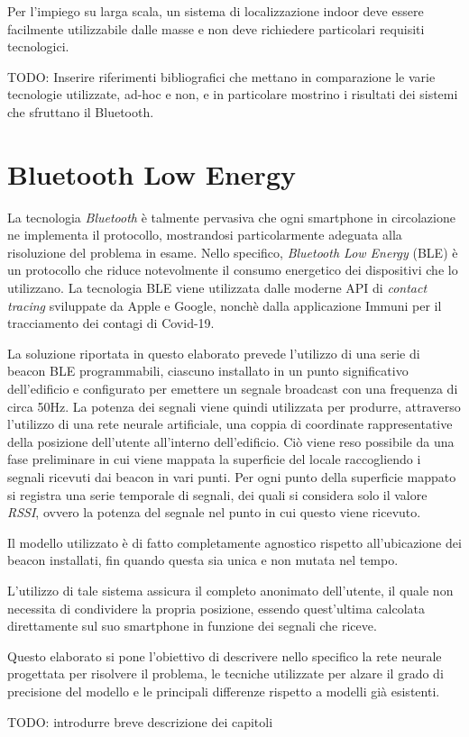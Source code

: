 \documentclass[draft]{standalone}
\begin{document}
Per l'impiego su larga scala, un sistema di localizzazione indoor deve essere
facilmente utilizzabile dalle masse e non deve richiedere particolari requisiti
tecnologici.

{\large TODO: Inserire riferimenti bibliografici che mettano in comparazione le
  varie tecnologie utilizzate, ad-hoc e non, e in particolare mostrino i
  risultati dei sistemi che sfruttano il Bluetooth.}

\section{Bluetooth Low Energy}
La tecnologia \emph{Bluetooth} è talmente pervasiva che ogni smartphone in
circolazione ne implementa il protocollo, mostrandosi particolarmente adeguata
alla risoluzione del problema in esame. Nello specifico, \emph{Bluetooth Low
  Energy} (BLE) è un protocollo che riduce notevolmente il consumo energetico
dei dispositivi che lo utilizzano. La tecnologia BLE viene utilizzata dalle
moderne API di \emph{contact tracing} sviluppate da Apple e Google, nonchè
dalla applicazione Immuni\cite{immuni} per il tracciamento dei contagi di
Covid-19\cite{apple-google}.

La soluzione riportata in questo elaborato prevede l'utilizzo di una serie di
beacon BLE programmabili, ciascuno installato in un punto significativo
dell'edificio e configurato per emettere un segnale broadcast con una frequenza
di circa 50Hz. La potenza dei segnali viene quindi utilizzata per produrre,
attraverso l'utilizzo di una rete neurale artificiale, una coppia di coordinate
rappresentative della posizione dell'utente all'interno dell'edificio. Ciò
viene reso possibile da una fase preliminare in cui viene mappata la superficie
del locale raccogliendo i segnali ricevuti dai beacon in vari punti. Per ogni
punto della superficie mappato si registra una serie temporale di segnali, dei
quali si considera solo il valore \emph{RSSI}, ovvero la potenza del segnale
nel punto in cui questo viene ricevuto.

Il modello utilizzato è di fatto completamente agnostico rispetto
all'ubicazione dei beacon installati, fin quando questa sia unica e non mutata
nel tempo.

L'utilizzo di tale sistema assicura il completo anonimato dell'utente, il quale
non necessita di condividere la propria posizione, essendo quest'ultima
calcolata direttamente sul suo smartphone in funzione dei segnali che riceve.

Questo elaborato si pone l'obiettivo di descrivere nello specifico la rete
neurale progettata per risolvere il problema, le tecniche utilizzate per alzare
il grado di precisione del modello e le principali differenze rispetto a
modelli già esistenti.

{\large TODO: introdurre breve descrizione dei capitoli }
\end{document}
